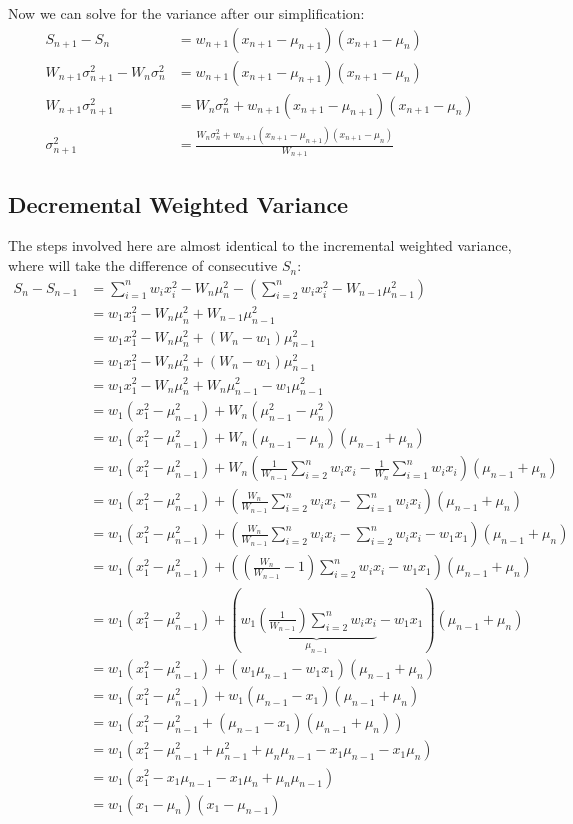 \documentclass[english,12pt]{article}
\theoremstyle{plain}
\theoremstyle{definition}
\theoremstyle{definition} %
\newcommand{\brac}[1]{\left(#1\right)} %
\begin{document}
Now we can solve for the variance after our simplification:
\begin{align*}
S_{n+1} - S_n &=w_{n+1}(x_{n+1} - \mu_{n+1})(x_{n+1} - \mu_n)\\
W_{n+1}\sigma_{n+1}^2 - W_n\sigma_n^2  &=w_{n+1}(x_{n+1} - \mu_{n+1})(x_{n+1} - \mu_n)\\
W_{n+1}\sigma_{n+1}^2 &= W_n\sigma_n^2 + w_{n+1}(x_{n+1} - \mu_{n+1})(x_{n+1} - \mu_n)\\
\sigma_{n+1}^2 &= \frac{W_n\sigma_n^2 + w_{n+1}(x_{n+1} - \mu_{n+1})(x_{n+1} - \mu_n)}{W_{n+1}}
\end{align*}

\subsection{Decremental Weighted Variance}
The steps involved here are almost identical to the incremental weighted variance, where will take the difference of consecutive $S_n$:
\begin{align*}
S_n - S_{n-1} &= \sum_{i=1}^{n} w_ix_i^2 - W_n\mu_n^2 - \brac{\sum_{i=2}^n w_ix_i^2 - W_{n-1}\mu_{n-1}^2}\\
&=w_1x_1^2 - W_n\mu_n^2 + W_{n-1}\mu_{n-1}^2\\
&=w_1x_1^2 - W_n\mu_n^2 + (W_n - w_1)\mu_{n-1}^2\\
&=w_1x_1^2 - W_n\mu_n^2 + (W_n - w_1)\mu_{n-1}^2\\
&=w_1x_1^2 - W_n\mu_n^2 + W_n\mu_{n-1}^2 - w_1\mu_{n-1}^2\\
&=w_1(x_1^2 - \mu_{n-1}^2) + W_n(\mu_{n-1}^2 - \mu_n^2)\\
&=w_1(x_1^2 - \mu_{n-1}^2) + W_n(\mu_{n-1} - \mu_n)(\mu_{n-1} + \mu_n)\\
&=w_1(x_1^2 - \mu_{n-1}^2) + W_n\brac{\frac{1}{W_{n-1}}\sum_{i=2}^n w_ix_i - \frac{1}{W_n}\sum_{i=1}^nw_ix_i}(\mu_{n-1} + \mu_n)\\
&=w_1(x_1^2 - \mu_{n-1}^2) + \brac{\frac{W_n}{W_{n-1}}\sum_{i=2}^n w_ix_i - \sum_{i=1}^nw_ix_i}(\mu_{n-1} + \mu_n)\\
&=w_1(x_1^2 - \mu_{n-1}^2) + \brac{\frac{W_n}{W_{n-1}}\sum_{i=2}^n w_ix_i - \sum_{i=2}^nw_ix_i - w_1x_1}(\mu_{n-1} + \mu_n)\\
&=w_1(x_1^2 - \mu_{n-1}^2) + \brac{\brac{\frac{W_n}{W_{n-1}}-1}\sum_{i=2}^n w_ix_i - w_1x_1}(\mu_{n-1} + \mu_n)\\
&=w_1(x_1^2 - \mu_{n-1}^2) + \brac{w_1\underbrace{\brac{\frac{1}{W_{n-1}}}\sum_{i=2}^n w_ix_i}_{\mu_{n-1}} - w_1x_1}(\mu_{n-1} + \mu_n)\\
&=w_1(x_1^2 - \mu_{n-1}^2) + (w_1\mu_{n-1} - w_1x_1)(\mu_{n-1} + \mu_n)\\
&=w_1(x_1^2 - \mu_{n-1}^2) + w_1(\mu_{n-1} - x_1)(\mu_{n-1} + \mu_n)\\
&=w_1(x_1^2 - \mu_{n-1}^2 + (\mu_{n-1} - x_1)(\mu_{n-1} + \mu_n))\\
&=w_1(x_1^2 - \mu_{n-1}^2 + \mu_{n-1}^2 + \mu_n\mu_{n-1} -x_1\mu_{n-1} - x_1\mu_n)\\
&=w_1(x_1^2 - x_1\mu_{n-1} - x_1\mu_n + \mu_n\mu_{n-1})\\
&=w_1(x_1 - \mu_n)(x_1 - \mu_{n-1})
\end{align*}
\end{document}
